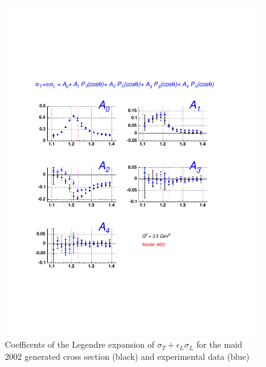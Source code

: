 \begin{figure}[h]
 \begin{center}
 \includegraphics[width = 12cm, bb=30 130 540 700]{analysis/img/A_comp_m02} 
  \caption[Coefficents of the Legendre expansion of $\sigma_T+\epsilon_L\sigma_L$ for the maid 2002 generated cross 
  section  and experimental data ]
{ Coefficents of the Legendre expansion of $\sigma_T+\epsilon_L\sigma_L$ for the maid 2002 generated cross 
  section (black) and experimental data (blue) }
 \label{fig:A_comp_m02}
\end{center}
\end{figure}

